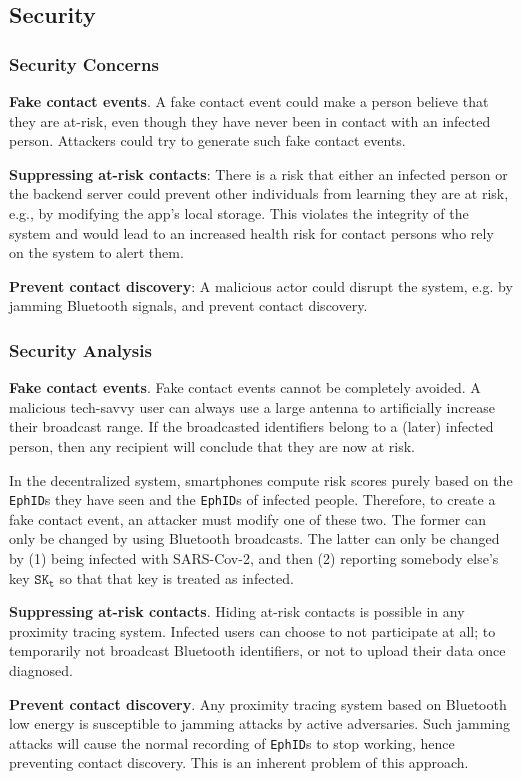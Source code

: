 \documentclass[12pt,a4paper]{article}
\begin{document}
\subsection*{Security}
\subsubsection*{Security Concerns}
\textbf{Fake contact events}. A fake contact event could make a person believe that they are at-risk, even though they have never been in contact with an infected person. Attackers could try to generate such fake contact events.

\textbf{Suppressing at-risk contacts}: There is a risk that either an infected person or the backend server could prevent other individuals from learning they are at risk, e.g., by modifying the app’s local storage. This violates the integrity of the system and would lead to an increased health risk for contact persons who rely on the system to alert them.

\textbf{Prevent contact discovery}: A malicious actor could disrupt the system, e.g. by jamming Bluetooth signals, and prevent contact discovery.
\subsubsection*{Security Analysis}
\textbf{Fake contact events}. Fake contact events cannot be completely avoided. A malicious tech-savvy user can always use a large antenna to artificially increase their broadcast range. If the broadcasted identifiers belong to a (later) infected person, then any recipient will conclude that they are now at risk.

In the decentralized system, smartphones compute risk scores purely based on the \texttt{EphID}s they have seen and the \texttt{EphID}s of infected people. Therefore, to create a fake contact event, an attacker must modify one of these two. The former can only be changed by using Bluetooth broadcasts. The latter can only be changed by (1) being infected with SARS-Cov-2, and then (2) reporting somebody else’s key $\texttt{SK}_\texttt{t}$ so that that key is treated as infected.

\textbf{Suppressing at-risk contacts}. Hiding at-risk contacts is possible in any proximity tracing system. Infected users can choose to not participate at all; to temporarily not broadcast Bluetooth identifiers, or not to upload their data once diagnosed.

\textbf{Prevent contact discovery}. Any proximity tracing system based on Bluetooth low energy is susceptible to jamming attacks by active adversaries. Such jamming attacks will cause the normal recording of \texttt{EphID}s to stop working, hence preventing contact discovery. This is an inherent problem of this approach.
\end{document}
